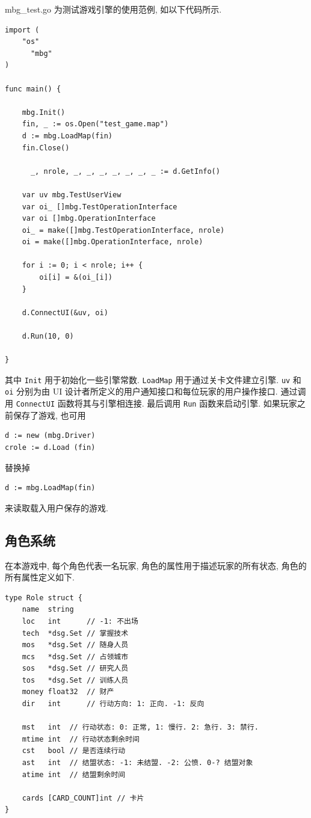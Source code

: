 \documentclass[UTF8, zihao=-4]{ctexart} %
\newcommand{\lcode}{\lstinline} % 段内插入代码
\begin{document}
mbg\_test.go 为测试游戏引擎的使用范例, 如以下代码所示.
\begin{lstlisting}
import (
	"os"
      "mbg"
)

func main() {

	mbg.Init()
	fin, _ := os.Open("test_game.map")
	d := mbg.LoadMap(fin)
	fin.Close()

      _, nrole, _, _, _, _, _, _, _ := d.GetInfo()

	var uv mbg.TestUserView
	var oi_ []mbg.TestOperationInterface
	var oi []mbg.OperationInterface
	oi_ = make([]mbg.TestOperationInterface, nrole)
	oi = make([]mbg.OperationInterface, nrole)

	for i := 0; i < nrole; i++ {
		oi[i] = &(oi_[i])
	}

	d.ConnectUI(&uv, oi)

	d.Run(10, 0)

}
\end{lstlisting}
其中 \lcode{Init} 用于初始化一些引擎常数. \lcode{LoadMap} 用于通过关卡文件建立引擎. 
\lcode{uv} 和 \lcode{oi} 分别为由 UI 设计者所定义的用户通知接口和每位玩家的用户操作接口. 通过调用 \lcode{ConnectUI} 函数将其与引擎相连接.
最后调用 \lcode{Run} 函数来启动引擎. 如果玩家之前保存了游戏, 也可用 
\begin{lstlisting}
d := new (mbg.Driver)
crole := d.Load (fin)
\end{lstlisting}
替换掉
\begin{lstlisting}
d := mbg.LoadMap(fin)
\end{lstlisting}
来读取载入用户保存的游戏.

\subsection{角色系统}
\label{s_role}
在本游戏中, 每个角色代表一名玩家, 角色的属性用于描述玩家的所有状态, 角色的所有属性定义如下.
\begin{lstlisting}
type Role struct {
	name  string
	loc   int      // -1: 不出场
	tech  *dsg.Set // 掌握技术
	mos   *dsg.Set // 随身人员
	mcs   *dsg.Set // 占领城市
	sos   *dsg.Set // 研究人员
	tos   *dsg.Set // 训练人员
	money float32  // 财产
	dir   int      // 行动方向: 1: 正向. -1: 反向

	mst   int  // 行动状态: 0: 正常, 1: 慢行. 2: 急行. 3: 禁行.
	mtime int  // 行动状态剩余时间
	cst   bool // 是否连续行动
	ast   int  // 结盟状态: -1: 未结盟. -2: 公愤. 0-? 结盟对象
	atime int  // 结盟剩余时间

	cards [CARD_COUNT]int // 卡片
}
\end{lstlisting}
\end{document}
